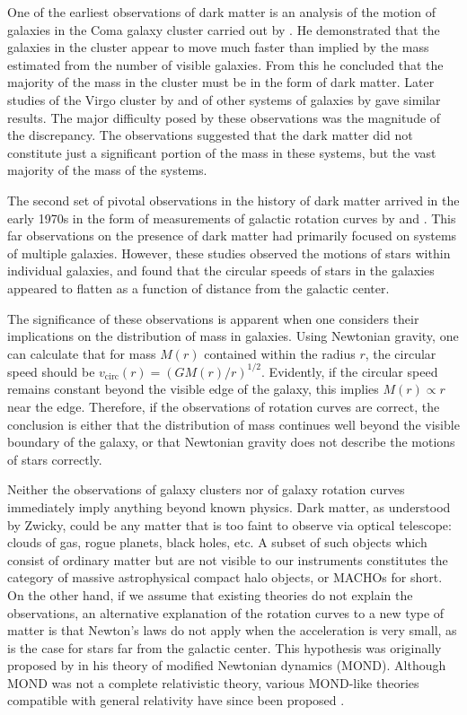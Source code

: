 One of the earliest observations of dark matter is an analysis of the motion of galaxies in the Coma galaxy cluster carried out by \textcite{Zwicky1933}. He demonstrated that the galaxies in the cluster appear to move much faster than implied by the mass estimated from the number of visible galaxies. From this he concluded that the majority of the mass in the cluster must be in the form of dark matter. Later studies of the Virgo cluster by \textcite{Smith1936} and of other systems of galaxies by \textcite{Holmberg1937} gave similar results. The major difficulty posed by these observations was the magnitude of the discrepancy. The observations suggested that the dark matter did not constitute just a significant portion of the mass in these systems, but the vast majority of the mass of the systems.

The second set of pivotal observations in the history of dark matter arrived in the early 1970s in the form of measurements of galactic rotation curves by \textcite{RubinFord1970} and \textcite{Freeman1970}. This far observations on the presence of dark matter had primarily focused on systems of multiple galaxies. However, these studies observed the motions of stars within individual galaxies, and found that the circular speeds of stars in the galaxies appeared to flatten as a function of distance from the galactic center.

The significance of these observations is apparent when one considers their implications on the distribution of mass in galaxies. Using Newtonian gravity, one can calculate that for mass $M(r)$ contained within the radius $r$, the circular speed should be $v_\text{circ}(r)=(GM(r)/r)^{1/2}$. Evidently, if the circular speed remains constant beyond the visible edge of the galaxy, this implies $M(r)\propto r$ near the edge. Therefore, if the observations of rotation curves are correct, the conclusion is either that the distribution of mass continues well beyond the visible boundary of the galaxy, or that Newtonian gravity does not describe the motions of stars correctly.

Neither the observations of galaxy clusters nor of galaxy rotation curves immediately imply anything beyond known physics. Dark matter, as understood by Zwicky, could be any matter that is too faint to observe via optical telescope: clouds of gas, rogue planets, black holes, etc. A subset of such objects which consist of ordinary matter but are not visible to our instruments constitutes the category of massive astrophysical compact halo objects, or MACHOs for short. On the other hand, if we assume that existing theories do not explain the observations, an alternative explanation of the rotation curves to a new type of matter is that Newton's laws do not apply when the acceleration is very small, as is the case for stars far from the galactic center. This hypothesis was originally proposed by \textcite{Milgrom1983} in his theory of modified Newtonian dynamics (MOND). Although MOND was not a complete relativistic theory, various MOND-like theories compatible with general relativity have since been proposed \parencites{Bekenstein2004, Milgrom2009, SkordisZlosnik2021}.

